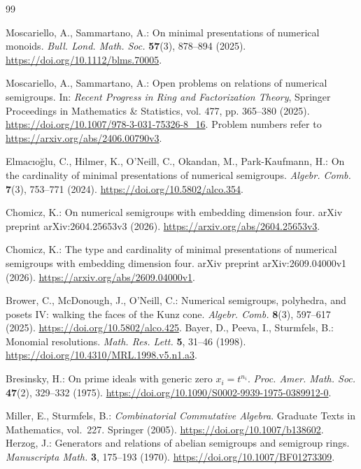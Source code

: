 \documentclass[11pt]{article}
\theoremstyle{definition}
\theoremstyle{remark}
\theoremstyle{plain}
\begin{document}
\begin{thebibliography}{99}
\setlength{\itemsep}{2pt}

 Moscariello, A., Sammartano, A.: On minimal presentations of numerical monoids. \emph{Bull. Lond. Math. Soc.} \textbf{57}(3), 878--894 (2025). \url{https://doi.org/10.1112/blms.70005}.

 Moscariello, A., Sammartano, A.: Open problems on relations of numerical semigroups. In: \emph{Recent Progress in Ring and Factorization Theory}, Springer Proceedings in Mathematics \& Statistics, vol. 477, pp. 365--380 (2025). \url{https://doi.org/10.1007/978-3-031-75326-8_16}.
Problem numbers refer to \url{https://arxiv.org/abs/2406.00790v3}.

 Elmac\i{}o\u{g}lu, C., Hilmer, K., O'Neill, C., Okandan, M., Park-Kaufmann, H.: On the cardinality of minimal presentations of numerical semigroups. \emph{Algebr. Comb.} \textbf{7}(3), 753--771 (2024). \url{https://doi.org/10.5802/alco.354}.

 Chomicz, K.: On numerical semigroups with embedding dimension four. arXiv preprint arXiv:2604.25653v3 (2026). \url{https://arxiv.org/abs/2604.25653v3}.

 Chomicz, K.: The type and cardinality of minimal presentations of numerical semigroups with embedding dimension four. arXiv preprint arXiv:2609.04000v1 (2026). \url{https://arxiv.org/abs/2609.04000v1}.

 Brower, C., McDonough, J., O'Neill, C.: Numerical semigroups, polyhedra, and posets IV: walking the faces of the Kunz cone. \emph{Algebr. Comb.} \textbf{8}(3), 597--617 (2025). \url{https://doi.org/10.5802/alco.425}.
Bayer, D., Peeva, I., Sturmfels, B.:
Monomial resolutions. \emph{Math. Res. Lett.} \textbf{5},
31--46 (1998).
\url{https://doi.org/10.4310/MRL.1998.v5.n1.a3}.

Bresinsky, H.: On prime ideals with generic zero $x_i=t^{n_i}$.
\emph{Proc. Amer. Math. Soc.} \textbf{47}(2), 329--332 (1975).
\url{https://doi.org/10.1090/S0002-9939-1975-0389912-0}.

Miller, E., Sturmfels, B.: \emph{Combinatorial Commutative Algebra}.
Graduate Texts in Mathematics, vol.~227. Springer (2005).
\url{https://doi.org/10.1007/b138602}.
Herzog, J.: Generators and relations of abelian semigroups and semigroup rings.
\emph{Manuscripta Math.} \textbf{3}, 175--193 (1970).
\url{https://doi.org/10.1007/BF01273309}.


\end{thebibliography}
\end{document}
